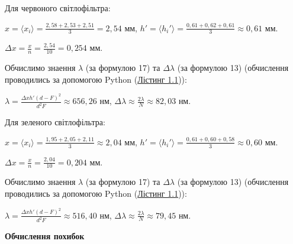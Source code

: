 \documentclass[12pt,a4paper]{article}
\begin{document}
    \setlength{\parindent}{0pt}

    Для червоного світлофільтра:

    \vspace{1em}

    $\displaystyle x = \langle x_i \rangle = \frac{2,58 + 2,53 + 2,51}{3} = 2,54$ мм,
    $\displaystyle h'= \langle h_i' \rangle = \frac{0,61 + 0,62 + 0,61}{3} \approx 0,61$ мм.

    $\displaystyle \Delta x = \frac{x}{n} = \frac{2,54}{10} = 0,254$ мм.

    \vspace{1em}

    Обчислимо знаення $\lambda$ (за формулою 17) та $\Delta \lambda$ (за формулою 13) (обчислення проводились за допомогою Python (\hyperlink{listing1}{Лістинг 1.1})):

    \vspace{1em}

    $\displaystyle \lambda = \frac{\Delta xh' \left( d - F \right)^2}{d^2 F} \approx 656,26$ нм, 
    $\displaystyle \Delta \lambda \approx \frac{2 \lambda}{N} \approx 82,03$ нм.

    \vspace{1em}

    Для зеленого світлофільтра:

    \vspace{1em}

    $\displaystyle x = \langle x_i \rangle = \frac{1,95 + 2,05 + 2,11}{3} \approx 2,04$ мм,
    $\displaystyle h'= \langle h_i' \rangle = \frac{0,61 + 0,60 + 0,58}{3} \approx 0,60$ мм.

    $\displaystyle \Delta x = \frac{x}{n} = \frac{2,04}{10} = 0,204$ мм.

    \vspace{1em}

    Обчислимо знаення $\lambda$ (за формулою 17) та $\Delta \lambda$ (за формулою 13) (обчислення проводились за допомогою Python (\hyperlink{listing1}{Лістинг 1.1})):

    \vspace{1em}

    $\displaystyle \lambda = \frac{\Delta xh' \left( d - F \right)^2}{d^2 F} \approx 516,40$ нм,
    $\displaystyle \Delta \lambda \approx \frac{2 \lambda}{N} \approx 79,45$ нм.

    \newpage
    \begin{center} \textbf{Обчислення похибок} \end{center}
\end{document}
